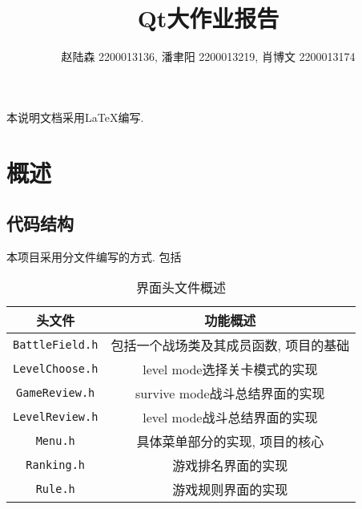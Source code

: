 \documentclass[UTF8,12pt]{ctexart}
\title{Qt大作业报告}
\author{赵陆森 2200013136, 潘聿阳 2200013219, 肖博文 2200013174}
\begin{document}
    \maketitle
    \tableofcontents
    \clearpage
    本说明文档采用\LaTeX 编写.
    \section{概述}
	    \subsection{代码结构}
	        本项目采用分文件编写的方式. 包括
	        \begin{table}[h]
	            \centering
	            \caption{界面头文件概述}
	            \begin{tabular}{cc}
	                \toprule
	                头文件                    & 功能概述                  \\
	                \midrule
	                \texttt{BattleField.h} & 包括一个战场类及其成员函数, 项目的基础  \\
	                \texttt{LevelChoose.h} & level mode选择关卡模式的实现   \\
	                \texttt{GameReview.h}  & survive mode战斗总结界面的实现 \\
	                \texttt{LevelReview.h} & level mode战斗总结界面的实现   \\
	                \texttt{Menu.h}        & 具体菜单部分的实现, 项目的核心      \\
	                \texttt{Ranking.h}     & 游戏排名界面的实现             \\
	                \texttt{Rule.h}        & 游戏规则界面的实现             \\
	                \bottomrule
	            \end{tabular}
	        \end{table}
\end{document}
